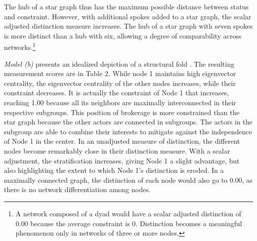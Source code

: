 \documentclass[12pt]{article}
\begin{document}
The hub of a star graph thus has the maximum possible distance between status and constraint. However, with additional spokes added to a star graph, the scalar adjusted distinction measure increases. The hub of a star graph with seven spokes is more distinct than a hub with six, allowing a degree of comparability across networks.\footnote{A network composed of a dyad would have a scalar adjusted distinction of 0.00 because the average constraint is 0. Distinction becomes a meaningful phenomenon only in networks of three or more nodes.} 

\textit{Model (b)} presents an idealized depiction of a structural fold \citep{vedres2010structural}. The resulting measurement scores are in Table 2. While node 1 maintains high eigenvector centrality, the eigenvector centrality of the other nodes increases, while their constraint decreases. It is actually the constraint of Node 1 that increases, reaching 1.00 because all its neighbors are maximally interconnected in their respective subgroups. This position of brokerage is more constrained than the star graph because the other actors are connected in subgroups. The actors in the subgroup are able to combine their interests to mitigate against the independence of Node 1 in the center. In an unadjusted measure of distinction, the different nodes become remarkably close in their distinction measure. With a scalar adjustment, the stratification increases, giving Node 1 a slight advantage, but also highlighting the extent to which Node 1's distinction is eroded. In a maximally connected graph, the distinction of each node would also go to 0.00, as there is no network differentiation among nodes. 
\end{document}
